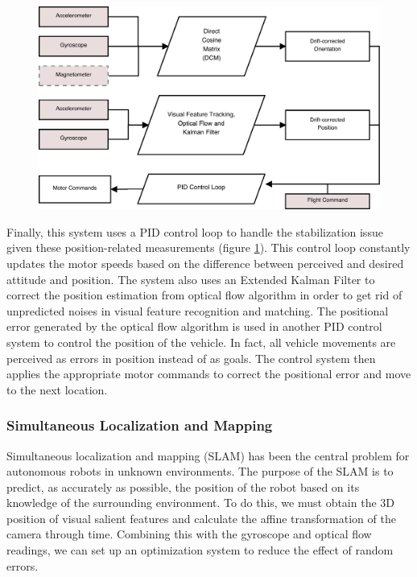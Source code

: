 \documentclass[12pt, letterpaper]{article}
\begin{document}
\begin{figure}[h]
\centering
\includegraphics[width=12cm]{images/PID.pdf}
\label{fig:PID}
\end{figure}

Finally, this system uses a PID control loop to handle the stabilization issue given these position-related measurements (figure \ref{fig:PID}). This control loop constantly updates the motor speeds based on the difference between perceived and desired attitude and position. The system also uses an Extended Kalman Filter to correct the position estimation from optical flow algorithm in order to get rid of unpredicted noises in visual feature recognition and matching. The positional error generated by the optical flow algorithm is used in another PID control system to control the position of the vehicle. In fact, all vehicle movements are perceived as errors in position instead of as goals. The control system then applies the appropriate motor commands to correct the positional error and move to the next location.

\subsubsection{Simultaneous Localization and Mapping}

Simultaneous localization and mapping (SLAM) has been the central problem for autonomous robots in unknown environments. The purpose of the SLAM is to predict, as accurately as possible, the position of the robot based on its knowledge of the surrounding environment.  To do this, we must obtain the 3D position of visual salient features and calculate the affine transformation of the camera through time. Combining this with the gyroscope and optical flow readings, we can set up an optimization system to reduce the effect of random errors.
\end{document}
